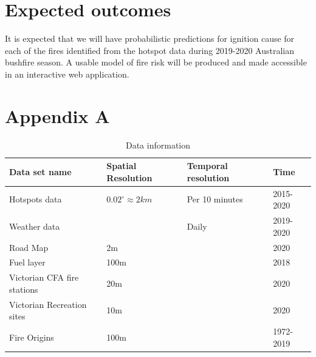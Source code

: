 \documentclass[11pt,a4paper,]{article}
\begin{document}
\hypertarget{expected-outcomes}{%
\section{Expected outcomes}\label{expected-outcomes}}

It is expected that we will have probabilistic predictions for ignition cause for each of the fires identified from the hotspot data during 2019-2020 Australian bushfire season. A usable model of fire risk will be produced and made accessible in an interactive web application.

\newpage

\hypertarget{appendix-a}{%
\section*{Appendix A}\label{appendix-a}}

\begin{table}

\caption{\label{tab:datasetinfo}Data information}
\centering
\begin{tabular}[t]{llll}
\toprule
Data set name & Spatial Resolution & Temporal resolution & Time\\
\midrule
Hotspots data & $0.02^\circ \approx 2km$ & Per 10 minutes & 2015-2020\\
Weather data &  & Daily & 2019-2020\\
Road Map & 2m &  & 2020\\
Fuel layer & 100m &  & 2018\\
Victorian CFA fire stations & 20m &  & 2020\\
\addlinespace
Victorian Recreation sites & 10m &  & 2020\\
Fire Origins & 100m &  & 1972-2019\\
\bottomrule
\end{tabular}
\end{table}
\end{document}
